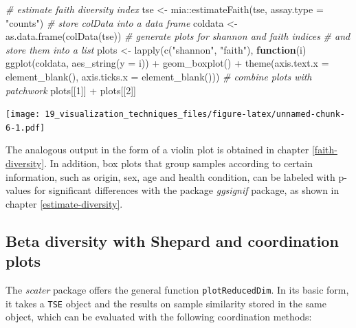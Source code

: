 \documentclass[
]{book}
\newenvironment{Shaded}{\begin{snugshade}}{\end{snugshade}}
\newcommand{\AttributeTok}[1]{\textcolor[rgb]{0.77,0.63,0.00}{#1}}
\newcommand{\CommentTok}[1]{\textcolor[rgb]{0.56,0.35,0.01}{\textit{#1}}}
\newcommand{\ControlFlowTok}[1]{\textcolor[rgb]{0.13,0.29,0.53}{\textbf{#1}}}
\newcommand{\DecValTok}[1]{\textcolor[rgb]{0.00,0.00,0.81}{#1}}
\newcommand{\FunctionTok}[1]{\textcolor[rgb]{0.00,0.00,0.00}{#1}}
\newcommand{\NormalTok}[1]{#1}
\newcommand{\OtherTok}[1]{\textcolor[rgb]{0.56,0.35,0.01}{#1}}
\newcommand{\SpecialCharTok}[1]{\textcolor[rgb]{0.00,0.00,0.00}{#1}}
\newcommand{\StringTok}[1]{\textcolor[rgb]{0.31,0.60,0.02}{#1}}
\begin{document}
\begin{Shaded}
\begin{Highlighting}[]
\CommentTok{\# estimate faith diversity index}
\NormalTok{tse }\OtherTok{\textless{}{-}}\NormalTok{ mia}\SpecialCharTok{::}\FunctionTok{estimateFaith}\NormalTok{(tse,}
                          \AttributeTok{assay.type =} \StringTok{"counts"}\NormalTok{)}
\CommentTok{\# store colData into a data frame}
\NormalTok{coldata }\OtherTok{\textless{}{-}} \FunctionTok{as.data.frame}\NormalTok{(}\FunctionTok{colData}\NormalTok{(tse))}
\CommentTok{\# generate plots for shannon and faith indices}
\CommentTok{\# and store them into a list}
\NormalTok{plots }\OtherTok{\textless{}{-}} \FunctionTok{lapply}\NormalTok{(}\FunctionTok{c}\NormalTok{(}\StringTok{"shannon"}\NormalTok{, }\StringTok{"faith"}\NormalTok{),}
                \ControlFlowTok{function}\NormalTok{(i) }\FunctionTok{ggplot}\NormalTok{(coldata, }\FunctionTok{aes\_string}\NormalTok{(}\AttributeTok{y =}\NormalTok{ i)) }\SpecialCharTok{+}
                  \FunctionTok{geom\_boxplot}\NormalTok{() }\SpecialCharTok{+}
                  \FunctionTok{theme}\NormalTok{(}\AttributeTok{axis.text.x =} \FunctionTok{element\_blank}\NormalTok{(),}
                        \AttributeTok{axis.ticks.x =} \FunctionTok{element\_blank}\NormalTok{()))}
\CommentTok{\# combine plots with patchwork}
\NormalTok{plots[[}\DecValTok{1}\NormalTok{]] }\SpecialCharTok{+}\NormalTok{ plots[[}\DecValTok{2}\NormalTok{]]}
\end{Highlighting}
\end{Shaded}

\texttt{[image: 19\_visualization\_techniques\_files/figure-latex/unnamed-chunk-6-1.pdf]}

The analogous output in the form of a violin plot is obtained in
chapter \ref{faith-diversity}. In addition, box plots that group
samples according to certain information, such as origin, sex, age and
health condition, can be labeled with p-values for significant
differences with the package \emph{ggsignif} package, as shown in chapter
\ref{estimate-diversity}.

\hypertarget{beta-diversity-with-shepard-and-coordination-plots}{%
\subsection{Beta diversity with Shepard and coordination plots}\label{beta-diversity-with-shepard-and-coordination-plots}}

The \emph{scater} package offers the general function \texttt{plotReducedDim}. In
its basic form, it takes a \texttt{TSE} object and the results on sample
similarity stored in the same object, which can be evaluated with the
following coordination methods:
\end{document}
